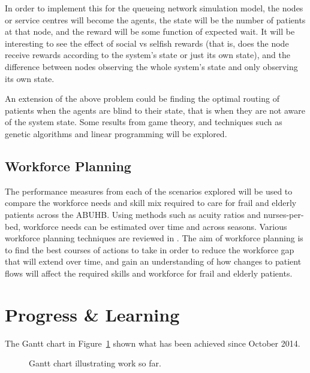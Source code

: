 \documentclass{article}
\begin{document}
In order to implement this for the queueing network simulation model, the nodes
or service centres will become the agents, the state will be the number of
patients at that node, and the reward will be some function of expected wait. %
It will be interesting to see the effect of social vs selfish rewards (that is,
does the node receive rewards according to the system's state or just its own
state), and the difference between nodes observing the whole system's state and
only observing its own state. %

An extension of the above problem could be finding the optimal routing of
patients when the agents are blind to their state, that is when they are not
aware of the system state.
Some results from game theory, and techniques such as genetic algorithms and
linear programming will be explored.


\subsection{Workforce Planning}

The performance measures from each of the scenarios explored will be used to
compare the workforce needs and skill mix required to care for frail and elderly
patients across the ABUHB. %
Using methods such as acuity ratios and nurses-per-bed, workforce needs can be estimated over time and across seasons.
Various workforce planning techniques are reviewed in \cite{hurst03}.
The aim of workforce planning is to find the best courses of actions to take in
order to reduce the workforce gap that will extend over time, and gain an
understanding of how changes to patient flows will affect the required skills
and workforce for frail and elderly patients. %


\section{Progress \& Learning}

The Gantt chart in Figure~\ref{fig:progressgantt} shown what has been achieved
since October 2014.

\begin{figure}
    
    \caption{Gantt chart illustrating work so far.}
    \label{fig:progressgantt}
\end{figure}
\end{document}
